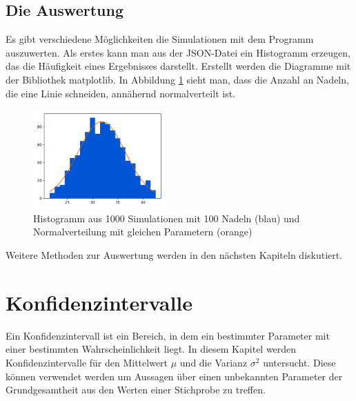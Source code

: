 \documentclass[10pt,twocolumn]{scrartcl}
\begin{document}
	\subsection{Die Auswertung}
		Es gibt verschiedene Möglichkeiten die Simulationen mit dem Programm auszuwerten. Als erstes kann man aus der JSON-Datei ein Histogramm erzeugen, das die Häufigkeit eines Ergebnisses darstellt. Erstellt werden die Diagramme mit der Bibliothek matplotlib\cite{matplotlib}. 
		In Abbildung \ref{fig:hist} sieht man, dass die Anzahl an Nadeln, die eine Linie schneiden, annähernd normalverteilt ist.

		\begin{figure}[htb]
			\centering
			\includegraphics[width=0.45\textwidth]{images/histogram_1000_no_interval_3.png}
			\caption{Histogramm aus 1000 Simulationen mit 100 Nadeln (blau) und Normalverteilung mit gleichen Parametern (orange)}
			\label{fig:hist}
		\end{figure}
		
		Weitere Methoden zur Auswertung werden in den nächsten Kapiteln diskutiert.

\section{Konfidenzintervalle}
		Ein Konfidenzintervall ist ein Bereich, in dem ein bestimmter Parameter mit einer bestimmten Wahrscheinlichkeit liegt. In diesem Kapitel werden Konfidenzintervalle für den Mittelwert $\mu$ und die Varianz $\sigma^2$ untersucht. Diese können verwendet werden um Aussagen über einen unbekannten Parameter der Grundgesamtheit aus den Werten einer Stichprobe zu treffen.
\end{document}
